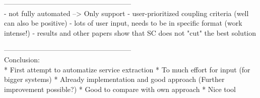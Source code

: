 ------------------------------------------------------\\

- not fully automated --> Only support
- user-prioritized coupling criteria (well can also be positive)
- lots of user input, needs to be in specific format (work intense!)
- results and other papers show that SC does not "cut" the best solution

------------------------------------------------------\\
Conclusion:\\
* First attempt to automatize service extraction
* To much effort for input (for bigger systems)
* Already implementation and good approach (Further improvement possible?)
* Good to compare with own approach
* Nice tool








